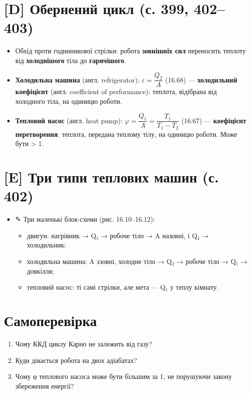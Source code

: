 \documentclass[11pt,a4paper,oneside]{book}
\newcommand{\pen}{{\sffamily\color{accent}✎}}
\begin{document}
\section*{[D] Обернений цикл (с. 399, 402–403)}
\begin{itemize}
\item Обхід проти годинникової стрілки: робота \textbf{зовнішніх сил} переносить теплоту від \textbf{холоднішого} тіла до \textbf{гарячішого}.
\item \textbf{Холодильна машина} (англ. refrigerator): $\varepsilon = \dfrac{Q_2}{A}$ (16.68) — \textbf{холодильний коефіцієнт} (англ. coefficient of performance): теплота, відібрана від холодного тіла, на одиницю роботи.
\item \textbf{Тепловий насос} (англ. heat pump): $\varphi = \dfrac{Q_1}{A} = \dfrac{T_1}{T_1 - T_2}$ (16.67) — \textbf{коефіцієнт перетворення}: теплота, передана теплому тілу, на одиницю роботи. Може бути > 1.
\end{itemize}

\section*{[E] Три типи теплових машин (с. 402)}
\begin{itemize}
\item \pen{} Три маленькі блок-схеми (рис. 16.10–16.12):
\begin{itemize}
\item двигун: нагрівник → Q₁ → робоче тіло → A назовні, і Q₂ → холодильник;
\item холодильна машина: A ззовні, холодне тіло → Q₂ → робоче тіло → Q₁ → довкілля;
\item тепловий насос: ті самі стрілки, але мета — Q₁ у теплу кімнату.
\end{itemize}
\end{itemize}

\section*{Самоперевірка}
\begin{enumerate}
\item Чому ККД циклу Карно не залежить від газу?
\item Куди дівається робота на двох адіабатах?
\item Чому φ теплового насоса може бути більшим за 1, не порушуючи закону збереження енергії?
\end{enumerate}
\end{document}
